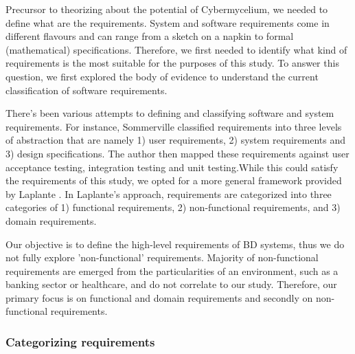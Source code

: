 \documentclass{bmcart}
\begin{document}
Precursor to theorizing about the potential of Cybermycelium, we needed to define what are the requirements. System and software requirements come in different flavours and can range from a sketch on a napkin to formal (mathematical) specifications. Therefore, we first needed to identify what kind of requirements is the most suitable for the purposes of this study. To answer this question, we first explored the body of evidence to understand the current classification of software requirements. 

There's been various attempts to defining and classifying software and system requirements. For instance, Sommerville \cite{sommerville2011software} classified requirements into three levels of abstraction that are namely 1) user requirements, 2) system requirements and 3) design specifications. The author then mapped these requirements against user acceptance testing, integration testing and unit testing.While this could satisfy the requirements of this study, we opted for a more general framework provided by Laplante \cite{laplante2017requirements}. In Laplante's approach, requirements are categorized into three categories of 1) functional requirements, 2) non-functional requirements, and 3) domain requirements. 

Our objective is to define the high-level requirements of BD systems, thus we do not fully explore 'non-functional' requirements. Majority of non-functional requirements are emerged from the particularities of an environment, such as a banking sector or healthcare, and do not correlate to our study. Therefore, our primary focus is on functional and domain requirements and secondly on non-functional requirements.

\subsubsection{Categorizing requirements} 
\end{document}
